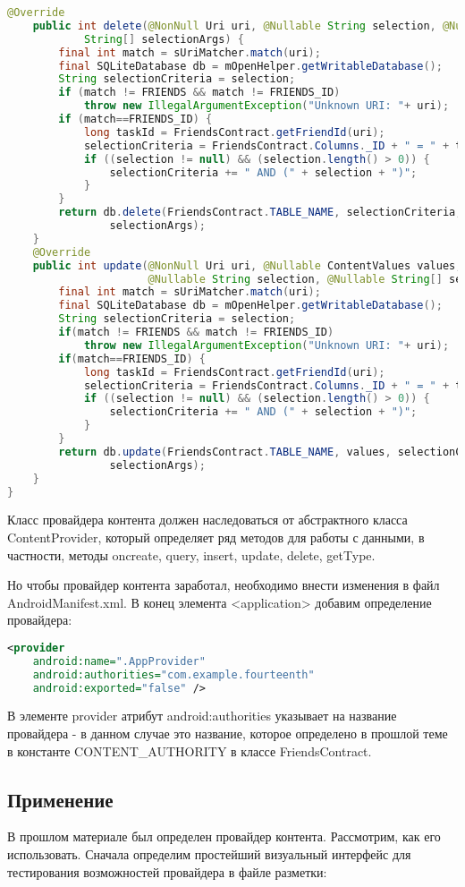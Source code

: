 \begin{lstlisting}[language=Java
	, label=lst:
	]
	@Override
	public int delete(@NonNull Uri uri, @Nullable String selection, @Nullable
			String[] selectionArgs) {
		final int match = sUriMatcher.match(uri);
		final SQLiteDatabase db = mOpenHelper.getWritableDatabase();
		String selectionCriteria = selection;
		if (match != FRIENDS && match != FRIENDS_ID)
			throw new IllegalArgumentException("Unknown URI: "+ uri);
		if (match==FRIENDS_ID) {
			long taskId = FriendsContract.getFriendId(uri);
			selectionCriteria = FriendsContract.Columns._ID + " = " + taskId;
			if ((selection != null) && (selection.length() > 0)) {
				selectionCriteria += " AND (" + selection + ")";
			}
		}
		return db.delete(FriendsContract.TABLE_NAME, selectionCriteria,
				selectionArgs);
	}
	@Override
	public int update(@NonNull Uri uri, @Nullable ContentValues values,
					  @Nullable String selection, @Nullable String[] selectionArgs) {
		final int match = sUriMatcher.match(uri);
		final SQLiteDatabase db = mOpenHelper.getWritableDatabase();
		String selectionCriteria = selection;
		if(match != FRIENDS && match != FRIENDS_ID)
			throw new IllegalArgumentException("Unknown URI: "+ uri);
		if(match==FRIENDS_ID) {
			long taskId = FriendsContract.getFriendId(uri);
			selectionCriteria = FriendsContract.Columns._ID + " = " + taskId;
			if ((selection != null) && (selection.length() > 0)) {
				selectionCriteria += " AND (" + selection + ")";
			}
		}
		return db.update(FriendsContract.TABLE_NAME, values, selectionCriteria,
				selectionArgs);
	}
}
\end{lstlisting}

Класс провайдера контента должен наследоваться от абстрактного класса
ContentProvider, который определяет ряд методов для работы с данными, в
частности, методы oncreate, query, insert, update, delete, getType.\par
Но чтобы провайдер контента заработал, необходимо внести изменения в
файл AndroidManifest.xml.
В конец элемента <application> добавим определение провайдера:

\begin{lstlisting}[language=XML
	, label=lst:
	]
<provider
	android:name=".AppProvider"
	android:authorities="com.example.fourteenth"
	android:exported="false" />
\end{lstlisting}

В элементе provider атрибут android:authorities указывает на название
провайдера - в данном случае это название, которое определено в прошлой
теме в константе CONTENT\_AUTHORITY в классе FriendsContract.

\subsection{Применение}
В прошлом материале был определен провайдер контента. Рассмотрим, как
его использовать. Сначала определим простейший визуальный интерфейс
для тестирования возможностей провайдера в файле разметки:

